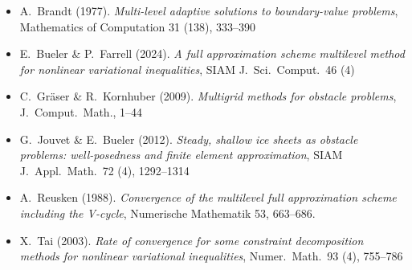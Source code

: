 
\begin{itemize}
\item A.~Brandt (1977). \emph{Multi-level adaptive solutions to boundary-value problems}, Mathematics of Computation 31 (138), 333--390 
\item E.~Bueler \& P.~Farrell (2024).  \emph{A full approximation scheme multilevel method for nonlinear variational inequalities}, SIAM J.~Sci.~Comput.~46 (4) 
\item C.~Gr{\"a}ser \& R.~Kornhuber (2009). \emph{Multigrid methods for obstacle problems}, J.~Comput.~Math., 1--44
\item G.~Jouvet \& E.~Bueler (2012). \emph{Steady, shallow ice sheets as obstacle problems: well-posedness and finite element approximation}, SIAM J.~Appl.~Math.~72 (4), 1292--1314 
\item A.~Reusken (1988). \emph{Convergence of the multilevel full approximation scheme including the V-cycle}, Numerische Mathematik 53, 663--686.
\item X.~Tai (2003). \emph{Rate of convergence for some constraint decomposition methods for nonlinear variational inequalities}, Numer.~Math.~93 (4), 755--786 
\end{itemize}

